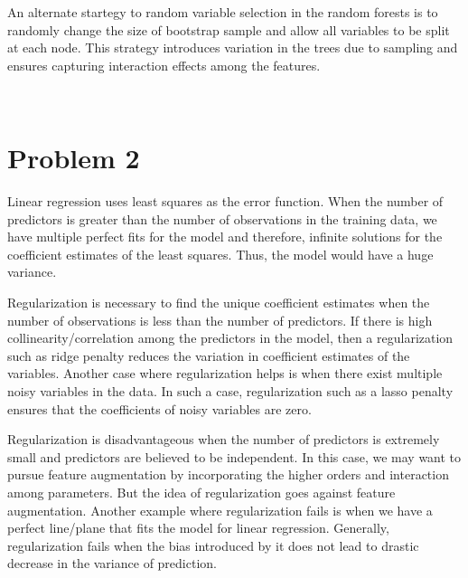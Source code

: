 \documentclass[11pt]{article}
\begin{document}
\vspace{5 mm}
\noindent
An alternate startegy to random variable selection in the random forests is to 
randomly change the size of bootstrap sample and allow all variables to be 
split at each node. This strategy introduces variation in the trees due to 
sampling and ensures capturing interaction effects among the features. 


\newpage
\begin{center}
\ \\
\end{center}

\section*{Problem 2}

\vspace{5 mm}
\noindent
Linear regression uses least squares as the error function. When the number of 
predictors is greater than the number of observations in the training data, we 
have multiple perfect fits for the model and therefore, infinite solutions for 
the coefficient estimates of the least squares. Thus, the model would have a 
huge variance.

\vspace{5 mm}
\noindent
Regularization is necessary to find the unique coefficient estimates when the 
number of observations is less than the number of predictors. If there is high 
collinearity/correlation among the predictors in the model, then a 
regularization such as ridge penalty reduces the variation in coefficient 
estimates of the variables. Another case where regularization helps is when 
there exist multiple noisy variables in the data. In such a case, 
regularization such as a lasso penalty ensures that the coefficients of noisy 
variables are zero.

\vspace{5 mm}
\noindent
Regularization is disadvantageous when the number of predictors is extremely 
small and predictors are believed to be  independent. In this case, we may want 
to pursue feature augmentation by incorporating the higher orders and 
interaction among parameters. But the idea of regularization goes against 
feature augmentation. Another example where regularization fails is when we 
have a perfect line/plane that fits the model for linear regression. Generally, 
regularization fails when the bias introduced by it does not lead to drastic 
decrease in the variance of prediction. 
\end{document}
